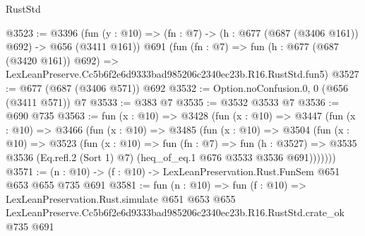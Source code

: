 \begin{lexlean}{RustStd}
\begin{coremodule}
@3523 := @3396
    (fun (y : @10) => (fn : @7) -> (h : @677 (@687 (@3406 @161)) @692) -> @656 (@3411 @161))
    @691
    (fun (fn : @7) =>
    fun (h : @677 (@687 (@3420 @161)) @692) =>
    LexLeanPreserve.Cc5b6f2e6d9333bad985206c2340ec23b.R16.RustStd.fun5)
@3527 := @677 (@687 (@3406 @571)) @692
@3532 := Option.noConfusion.{0, 0} (@656 (@3411 @571)) @7
@3533 := @383 @7
@3535 := @3532 @3533 @7
@3536 := @690 @735
@3563 := fun (x : @10) =>
  @3428
    (fun (x : @10) =>
    @3447
      (fun (x : @10) =>
      @3466
        (fun (x : @10) =>
        @3485
          (fun (x : @10) =>
          @3504
            (fun (x : @10) =>
            @3523
              (fun (x : @10) =>
              fun (fn : @7) =>
              fun (h : @3527) =>
              @3535 @3536 (Eq.refl.{2} (Sort 1) @7) (heq_of_eq.{1} @676 @3533 @3536 @691)))))))
@3571 := (n : @10) -> (f : @10) -> LexLeanPreservation.Rust.FunSem @651 @653 @655 @735 @691
@3581 := fun (n : @10) =>
  fun (f : @10) =>
  LexLeanPreservation.Rust.simulate
    @651
    @653
    @655
    LexLeanPreserve.Cc5b6f2e6d9333bad985206c2340ec23b.R16.RustStd.crate_ok
    @735
    @691
\end{coremodule}
\end{lexlean}

